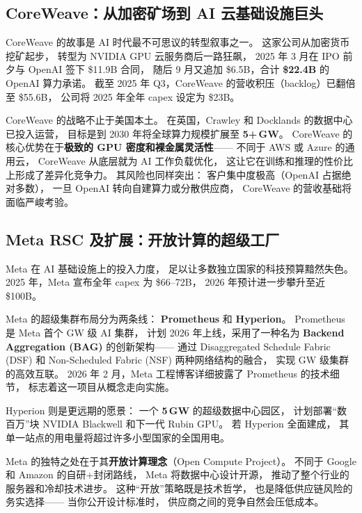 \subsection{CoreWeave：从加密矿场到 AI 云基础设施巨头}
\label{subsec:coreweave-cluster}

CoreWeave 的故事是 AI 时代最不可思议的转型叙事之一。
这家公司从加密货币挖矿起步，
转型为 NVIDIA GPU 云服务商后一路狂飙，
2025 年 3 月在 IPO 前夕与 OpenAI 签下 \$11.9B 合同，
随后 9 月又追加 \$6.5B，合计 \textbf{\$22.4B} 的 OpenAI 算力承诺。
截至 2025 年 Q3，CoreWeave 的营收积压（backlog）已翻倍至 \$55.6B，
公司将 2025 年全年 capex 设定为 \$23B。

CoreWeave 的战略不止于美国本土。
在英国，Crawley 和 Docklands 的数据中心已投入运营，
目标是到 2030 年将全球算力规模扩展至 \textbf{5+\,GW}。
CoreWeave 的核心优势在于\textbf{极致的 GPU 密度和裸金属灵活性}——
不同于 AWS 或 Azure 的通用云，
CoreWeave 从底层就为 AI 工作负载优化，
这让它在训练和推理的性价比上形成了差异化竞争力。
其风险也同样突出：
客户集中度极高（OpenAI 占据绝对多数），
一旦 OpenAI 转向自建算力或分散供应商，
CoreWeave 的营收基础将面临严峻考验。

\subsection{Meta RSC 及扩展：开放计算的超级工厂}
\label{subsec:meta-rsc}

Meta 在 AI 基础设施上的投入力度，
足以让多数独立国家的科技预算黯然失色。
2025 年，Meta 宣布全年 capex 为 \$66--72B，
2026 年预计进一步攀升至近 \$100B。

Meta 的超级集群布局分为两条线：
\textbf{Prometheus} 和 \textbf{Hyperion}。
Prometheus 是 Meta 首个 GW 级 AI 集群，
计划 2026 年上线，采用了一种名为
\textbf{Backend Aggregation (BAG)} 的创新架构——
通过 Disaggregated Schedule Fabric (DSF) 和
Non-Scheduled Fabric (NSF) 两种网络结构的融合，
实现 GW 级集群的高效互联。
2026 年 2 月，Meta 工程博客详细披露了 Prometheus 的技术细节，
标志着这一项目从概念走向实施。

Hyperion 则是更远期的愿景：
一个 \textbf{5\,GW} 的超级数据中心园区，
计划部署``数百万''块 NVIDIA Blackwell 和下一代 Rubin GPU。
若 Hyperion 全面建成，
其单一站点的用电量将超过许多小型国家的全国用电。

Meta 的独特之处在于其\textbf{开放计算理念}（Open Compute Project）。
不同于 Google 和 Amazon 的自研+封闭路线，
Meta 将数据中心设计开源，
推动了整个行业的服务器和冷却技术进步。
这种``开放''策略既是技术哲学，
也是降低供应链风险的务实选择——
当你公开设计标准时，
供应商之间的竞争自然会压低成本。

